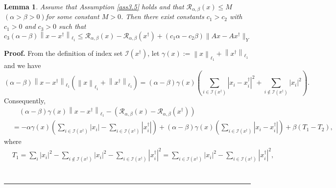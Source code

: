 \documentclass[a4paper,12pt]{article}
\newtheorem{lemma}[theorem]{Lemma}
\numberwithin{equation}{section}
\newenvironment{proof}[1][Proof]{\textbf{#1.} }
{\ \rule{0.75em}{0.75em}\smallskip}
\begin{document}
\begin{lemma}\label{lem3.6}
    Assume that Assumption \ref{ass3.5} holds and that $\mathcal{R}_{\alpha,\beta}\left(x\right)\leq M$ $\left(\alpha>\beta>0\right)$for some constant $M>0$. Then there exist constants $c_{1}>c_{2}$ with $c_{1}>0$ and $c_{3}>0$ such that
    \begin{equation}\label{equ3.4}
        c_{3}\left(\alpha-\beta\right)\left\|x-x^{\dagger}\right\|_{\ell_{1}} \leq\mathcal{R}_{\alpha,\beta}\left(x\right)-\mathcal{R}_{\alpha,\beta}\left(x^{\dagger}\right) +\left(c_{1}\alpha-c_{2}\beta\right)\|Ax-Ax^{\dagger}\|_{Y}
    \end{equation}
\end{lemma}

\begin{proof}
    From the definition of index set $\mathcal{I}\left(x^{\dagger}\right)$, let $\gamma\left(x\right):= \left\|x \right\|_{\ell_{1}}+\left\|x^{\dagger}\right\|_{\ell_{1}}$ and we have
    \begin{equation*}
        \left(\alpha-\beta\right)\left\|x-x^{\dagger}\right\|_{\ell_{1}}\left(\left\|x \right\|_{\ell_{1}}+\left\|x^{\dagger}\right\|_{\ell_{1}}\right)
        =\left(\alpha-\beta\right)\gamma\left(x\right)\left(\sum_{i\in\mathcal{I}\left(x^{\dagger}\right)} \left|x_{i}-x_{i}^{\dagger}\right|^{2}+\sum_{i\notin\mathcal{I}\left(x^{\dagger} \right)}\left|x_{i}\right|^{2}\right).
    \end{equation*}
    Consequently,
    \begin{align}\label{equ3.5}
        &  \quad \left(\alpha-\beta\right)\gamma\left(x\right)\left\|x-x^{\dagger}\right\|_{\ell_{1}}- \left(\mathcal{R}_{\alpha,\beta}\left(x\right)-\mathcal{R}_{\alpha,\beta}\left(x^{\dagger}\right)\right) \nonumber\\
        &  = -\alpha\gamma\left(x\right)\left(\sum_{i\in\mathcal{I}\left(x^{\dagger}\right)}\left|x_{i}\right| -\sum_{i\in\mathcal{I}\left(x^{\dagger}\right)}\left|x_{i}^{\dagger}\right|\right) +\left(\alpha-\beta\right)\gamma\left(x\right)\left(\sum_{i\in\mathcal{I}\left(x^{\dagger}\right)} \left|x_{i}- x_{i}^{\dagger}\right|\right) +\beta\left(T_{1}-T_{2}\right),
    \end{align}
    where
    \begin{align*}
        & T_{1}= \sum_{i}\left|x_{i}\right|^{2} -\sum_{i\notin\mathcal{I}\left(x^{\dagger}\right)}\left|x_{i}\right|^{2} -\sum_{i\in\mathcal{I}\left(x^{\dagger}\right)}\left|x_{i}^{\dagger}\right|^{2} =\sum_{i\in\mathcal{I}\left(x^{\dagger}\right)}\left|x_{i}\right|^{2}- \sum_{i\in\mathcal{I}\left(x^{\dagger}\right)}\left|x_{i}^{\dagger}\right|^{2}, \\

\end{align*}
\end{proof}
\end{document}
